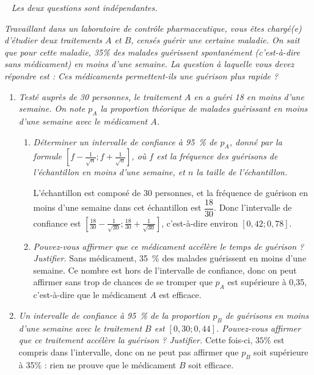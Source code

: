 \documentclass[12pt]{article}
\begin{document}
\begin{exercice}[Échantillonnage]~
  \noindent\emph{Les deux questions sont indépendantes.}

  \emph{Travaillant dans un laboratoire de contrôle pharmaceutique, vous êtes chargé(e) d'étudier deux traitements $A$ et $B$, censés guérir une certaine maladie. On sait que pour cette maladie, 35\% des malades guérissent spontanément (c'est-à-dire sans médicament) en moins d'une semaine. La question à laquelle vous devez répondre est : Ces médicaments permettent-ils une guérison plus rapide ?}

  \begin{enumerate}
    \item \emph{Testé auprès de 30 personnes, le traitement $A$ en a guéri 18 en moins d'une semaine. On note $p_A$ la proportion théorique de malades guérissant en moins d'une semaine avec le médicament $A$.}
      \begin{enumerate}
        \item \emph{Déterminer un intervalle de confiance à 95~\% de $p_A$, donné par la formule $\left[f-\frac{1}{\sqrt{n}};f+\frac{1}{\sqrt{n}}\right]$, où $f$ est la fréquence des guérisons de l'échantillon en moins d'une semaine, et $n$ la taille de l'échantillon.}

          L'échantillon est composé de 30 personnes, et la fréquence de guérison en moins d'une semaine dans cet échantillon est $\dfrac{18}{30}$. Donc l'intervalle de confiance est $\left[ \frac{18}{30}-\frac{1}{\sqrt{30}};\frac{18}{30}+\frac{1}{\sqrt{30}}  \right]$, c'est-à-dire environ $\left[ 0,42;0,78 \right]$.
        \item \emph{Pouvez-vous affirmer que ce médicament accélère le temps de guérison ? Justifier.} Sans médicament, 35~\% des malades guérissent en moins d'une semaine. Ce nombre est hors de l'intervalle de confiance, donc on peut affirmer sans trop de chances de se tromper que $p_A$ est supérieure à 0,35, c'est-à-dire que le médicament $A$ est efficace.
      \end{enumerate}
    \item \emph{Un intervalle de confiance à 95~\% de la proportion $p_B$ de guérisons en moins d'une semaine avec le traitement $B$ est $\left[0,30;0,44\right]$. Pouvez-vous affirmer que ce traitement accélère la guérison ? Justifier.}
      Cette fois-ci, $35\%$ est compris dans l'intervalle, donc on ne peut pas affirmer que $p_B$ soit supérieure à 35\% : rien ne prouve que le médicament $B$ soit efficace.
  \end{enumerate}
\end{exercice}
\end{document}
